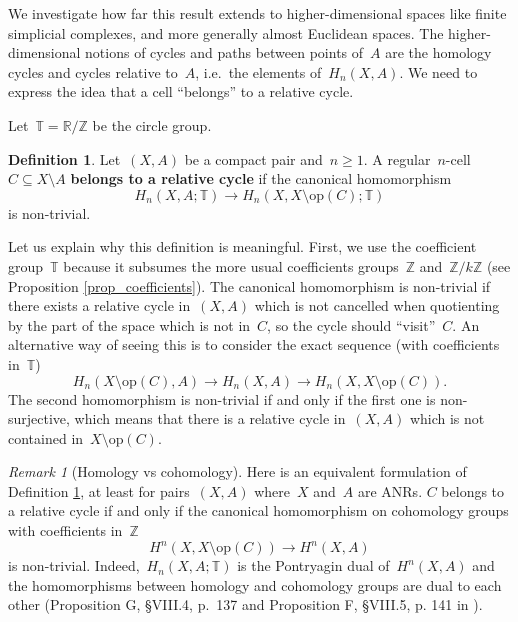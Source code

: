 \documentclass[english,11pt]{article}
\theoremstyle{plain}
\theoremstyle{remark}
\newtheorem{remark}{Remark}[section]
\theoremstyle{definition}
\newtheorem{definition}{Definition}[section]
\newcommand{\op}[1]{\mathrm{op}(#1)}
\newcommand{\R}{\mathbb{R}}
\newcommand{\Z}{\mathbb{Z}}
\newcommand{\RZ}{\mathbb{T}}%
\begin{document}
We investigate how far this result extends to higher-dimensional spaces like finite simplicial complexes, and more generally almost Euclidean spaces. The higher-dimensional notions of cycles and paths between points of~$A$ are the homology cycles and cycles relative to~$A$, i.e.~the elements of~$H_n(X,A)$. We need to express the idea that a cell ``belongs'' to a relative cycle.

Let~$\RZ=\R/\Z$ be the circle group.
\begin{definition}\label{def_cycle}
Let~$(X,A)$ be a compact pair and~$n\geq 1$. A regular~$n$-cell~$C\subseteq X\setminus A$ \textbf{belongs to a relative cycle} if the canonical homomorphism
\begin{equation*}
H_n(X,A;\RZ)\to H_n(X,X\setminus \op{C};\RZ)
\end{equation*}
is non-trivial.
\end{definition}

Let us explain why this definition is meaningful. First, we use the coefficient group~$\RZ$ because it subsumes the more usual coefficients groups~$\Z$ and~$\Z/k\Z$ (see Proposition \ref{prop_coefficients}). The canonical homomorphism is non-trivial if there exists a relative cycle in~$(X,A)$ which is not cancelled when quotienting by the part of the space which is not in~$C$, so the cycle should ``visit''~$C$. An alternative way of seeing this is to consider the exact sequence (with coefficients in~$\RZ$)
\begin{equation*}
H_n(X\setminus \op{C},A)\to H_n(X,A)\to H_n(X,X\setminus \op{C}).
\end{equation*}
The second homomorphism is non-trivial if and only if the first one is non-surjective, which means that there is a relative cycle in~$(X,A)$ which is not contained in~$X\setminus \op{C}$.

\begin{remark}[Homology vs cohomology]
Here is an equivalent formulation of Definition \ref{def_cycle}, at least for pairs~$(X,A)$ where~$X$ and~$A$ are ANRs. $C$ belongs to a relative cycle if and only if the canonical homomorphism on cohomology groups with coefficients in~$\Z$
\begin{equation*}
H^n(X,X\setminus \op{C})\to H^n(X,A)
\end{equation*}
is non-trivial. Indeed,~$H_n(X,A;\RZ)$ is the Pontryagin dual of~$H^n(X,A)$ and the homomorphisms between homology and cohomology groups are dual to each other (Proposition G, \S VIII.4, p.~137 and Proposition F, \S VIII.5, p. 141 in \cite{HurWal41}).
\end{remark}
\end{document}

